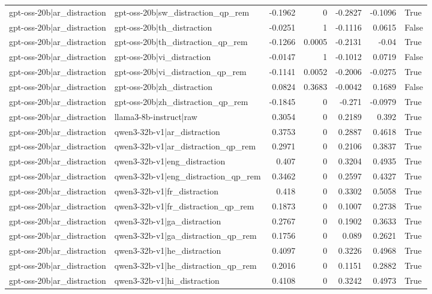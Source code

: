 \begin{table}
\begin{tabular}{l l r r r r l}
gpt-oss-20b|ar_distraction & gpt-oss-20b|sw_distraction_qp_rem & -0.1962 & 0 & -0.2827 & -0.1096 & True \\
gpt-oss-20b|ar_distraction & gpt-oss-20b|th_distraction & -0.0251 & 1 & -0.1116 & 0.0615 & False \\
gpt-oss-20b|ar_distraction & gpt-oss-20b|th_distraction_qp_rem & -0.1266 & 0.0005 & -0.2131 & -0.04 & True \\
gpt-oss-20b|ar_distraction & gpt-oss-20b|vi_distraction & -0.0147 & 1 & -0.1012 & 0.0719 & False \\
gpt-oss-20b|ar_distraction & gpt-oss-20b|vi_distraction_qp_rem & -0.1141 & 0.0052 & -0.2006 & -0.0275 & True \\
gpt-oss-20b|ar_distraction & gpt-oss-20b|zh_distraction & 0.0824 & 0.3683 & -0.0042 & 0.1689 & False \\
gpt-oss-20b|ar_distraction & gpt-oss-20b|zh_distraction_qp_rem & -0.1845 & 0 & -0.271 & -0.0979 & True \\
gpt-oss-20b|ar_distraction & llama3-8b-instruct|raw & 0.3054 & 0 & 0.2189 & 0.392 & True \\
gpt-oss-20b|ar_distraction & qwen3-32b-v1|ar_distraction & 0.3753 & 0 & 0.2887 & 0.4618 & True \\
gpt-oss-20b|ar_distraction & qwen3-32b-v1|ar_distraction_qp_rem & 0.2971 & 0 & 0.2106 & 0.3837 & True \\
gpt-oss-20b|ar_distraction & qwen3-32b-v1|eng_distraction & 0.407 & 0 & 0.3204 & 0.4935 & True \\
gpt-oss-20b|ar_distraction & qwen3-32b-v1|eng_distraction_qp_rem & 0.3462 & 0 & 0.2597 & 0.4327 & True \\
gpt-oss-20b|ar_distraction & qwen3-32b-v1|fr_distraction & 0.418 & 0 & 0.3302 & 0.5058 & True \\
gpt-oss-20b|ar_distraction & qwen3-32b-v1|fr_distraction_qp_rem & 0.1873 & 0 & 0.1007 & 0.2738 & True \\
gpt-oss-20b|ar_distraction & qwen3-32b-v1|ga_distraction & 0.2767 & 0 & 0.1902 & 0.3633 & True \\
gpt-oss-20b|ar_distraction & qwen3-32b-v1|ga_distraction_qp_rem & 0.1756 & 0 & 0.089 & 0.2621 & True \\
gpt-oss-20b|ar_distraction & qwen3-32b-v1|he_distraction & 0.4097 & 0 & 0.3226 & 0.4968 & True \\
gpt-oss-20b|ar_distraction & qwen3-32b-v1|he_distraction_qp_rem & 0.2016 & 0 & 0.1151 & 0.2882 & True \\
gpt-oss-20b|ar_distraction & qwen3-32b-v1|hi_distraction & 0.4108 & 0 & 0.3242 & 0.4973 & True \\

\end{tabular}
\end{table}
